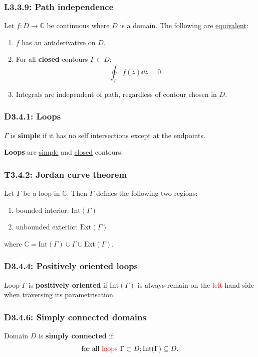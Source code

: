 \documentclass{article}
\begin{document}
\begin{multicols*}{3}
\subsubsection*{L3.3.9: Path independence}
Let $f:D\rightarrow\mathbb{C}$ be continuous where
$D$ is a domain. The following are \underline{equivalent}:
\begin{enumerate}
    \item $f$ has an antiderivative on $D$.
    \item For all \textbf{closed} contours $\Gamma\subset D$:
    $$\oint_{\Gamma}f(z)\dd z=0.$$

    \item Integrals are independent of path, regardless
    of contour chosen in $D$.
\end{enumerate}

\subsubsection*{D3.4.1: Loops}
$\Gamma$ is \textbf{simple} if it has no self intersections
except at the endpoints.

\textbf{Loops} are \underline{simple} and
\underline{closed} contours.

\subsubsection*{T3.4.2: Jordan curve theorem}
Let $\Gamma$ be a loop in $\mathbb{C}$. Then $\Gamma$ defines 
the following two regions:
\begin{enumerate}
    \item bounded interior: $\text{Int}(\Gamma)$
    \item unbounded exterior: $\text{Ext}(\Gamma)$
\end{enumerate}
where $\mathbb{C}=\text{Int}(\Gamma)\cup\Gamma
\cup\text{Ext}(\Gamma)$.

\subsubsection*{D3.4.4: Positively oriented loops}
Loop $\Gamma$ is \textbf{positively oriented} if
$\text{Int}(\Gamma)$ is always remain on the \textcolor{red}{left} 
hand side when traversing its parametrisation.

\subsubsection*{D3.4.6: Simply connected domains}
Domain $D$ is \textbf{simply connected} if: 
$$\text{for all \textcolor{red}{loops}}\hspace{0.05in}
\Gamma\subset D;\text{Int}(\Gamma)\subseteq D.$$


\end{multicols*}
\end{document}
